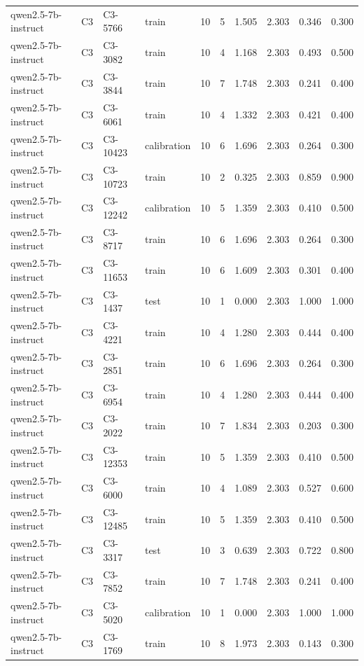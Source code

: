 \begin{table}
\begin{tabular}{llllrrrrrr}
qwen2.5-7b-instruct & C3 & C3-5766 & train & 10 & 5 & 1.505 & 2.303 & 0.346 & 0.300 \\
qwen2.5-7b-instruct & C3 & C3-3082 & train & 10 & 4 & 1.168 & 2.303 & 0.493 & 0.500 \\
qwen2.5-7b-instruct & C3 & C3-3844 & train & 10 & 7 & 1.748 & 2.303 & 0.241 & 0.400 \\
qwen2.5-7b-instruct & C3 & C3-6061 & train & 10 & 4 & 1.332 & 2.303 & 0.421 & 0.400 \\
qwen2.5-7b-instruct & C3 & C3-10423 & calibration & 10 & 6 & 1.696 & 2.303 & 0.264 & 0.300 \\
qwen2.5-7b-instruct & C3 & C3-10723 & train & 10 & 2 & 0.325 & 2.303 & 0.859 & 0.900 \\
qwen2.5-7b-instruct & C3 & C3-12242 & calibration & 10 & 5 & 1.359 & 2.303 & 0.410 & 0.500 \\
qwen2.5-7b-instruct & C3 & C3-8717 & train & 10 & 6 & 1.696 & 2.303 & 0.264 & 0.300 \\
qwen2.5-7b-instruct & C3 & C3-11653 & train & 10 & 6 & 1.609 & 2.303 & 0.301 & 0.400 \\
qwen2.5-7b-instruct & C3 & C3-1437 & test & 10 & 1 & 0.000 & 2.303 & 1.000 & 1.000 \\
qwen2.5-7b-instruct & C3 & C3-4221 & train & 10 & 4 & 1.280 & 2.303 & 0.444 & 0.400 \\
qwen2.5-7b-instruct & C3 & C3-2851 & train & 10 & 6 & 1.696 & 2.303 & 0.264 & 0.300 \\
qwen2.5-7b-instruct & C3 & C3-6954 & train & 10 & 4 & 1.280 & 2.303 & 0.444 & 0.400 \\
qwen2.5-7b-instruct & C3 & C3-2022 & train & 10 & 7 & 1.834 & 2.303 & 0.203 & 0.300 \\
qwen2.5-7b-instruct & C3 & C3-12353 & train & 10 & 5 & 1.359 & 2.303 & 0.410 & 0.500 \\
qwen2.5-7b-instruct & C3 & C3-6000 & train & 10 & 4 & 1.089 & 2.303 & 0.527 & 0.600 \\
qwen2.5-7b-instruct & C3 & C3-12485 & train & 10 & 5 & 1.359 & 2.303 & 0.410 & 0.500 \\
qwen2.5-7b-instruct & C3 & C3-3317 & test & 10 & 3 & 0.639 & 2.303 & 0.722 & 0.800 \\
qwen2.5-7b-instruct & C3 & C3-7852 & train & 10 & 7 & 1.748 & 2.303 & 0.241 & 0.400 \\
qwen2.5-7b-instruct & C3 & C3-5020 & calibration & 10 & 1 & 0.000 & 2.303 & 1.000 & 1.000 \\
qwen2.5-7b-instruct & C3 & C3-1769 & train & 10 & 8 & 1.973 & 2.303 & 0.143 & 0.300 \\

\end{tabular}
\end{table}
